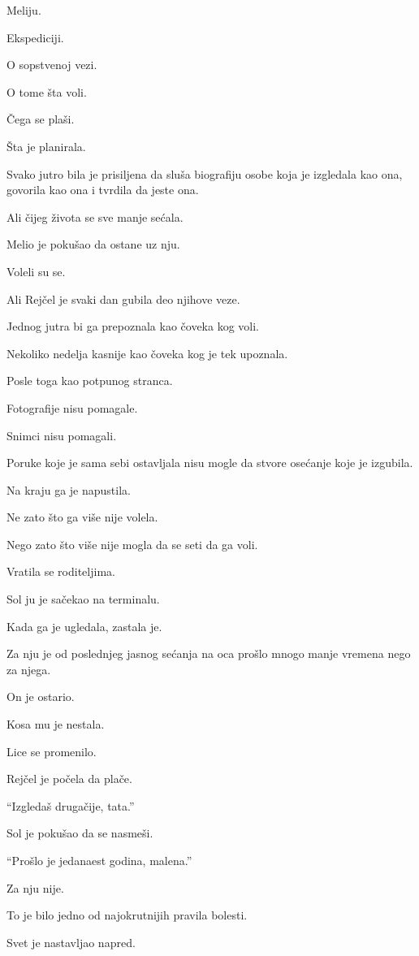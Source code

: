 Meliju.

Ekspediciji.

O sopstvenoj vezi.

O tome šta voli.

Čega se plaši.

Šta je planirala.

Svako jutro bila je prisiljena da sluša biografiju osobe koja je izgledala kao ona, govorila kao ona i tvrdila da jeste ona.

Ali čijeg života se sve manje sećala.

Melio je pokušao da ostane uz nju.

Voleli su se.

Ali Rejčel je svaki dan gubila deo njihove veze.

Jednog jutra bi ga prepoznala kao čoveka kog voli.

Nekoliko nedelja kasnije kao čoveka kog je tek upoznala.

Posle toga kao potpunog stranca.

Fotografije nisu pomagale.

Snimci nisu pomagali.

Poruke koje je sama sebi ostavljala nisu mogle da stvore osećanje koje je izgubila.

Na kraju ga je napustila.

Ne zato što ga više nije volela.

Nego zato što više nije mogla da se seti da ga voli.

\bigskip

Vratila se roditeljima.

Sol ju je sačekao na terminalu.

Kada ga je ugledala, zastala je.

Za nju je od poslednjeg jasnog sećanja na oca prošlo mnogo manje vremena nego za njega.

On je ostario.

Kosa mu je nestala.

Lice se promenilo.

Rejčel je počela da plače.

``Izgledaš drugačije, tata.''

Sol je pokušao da se nasmeši.

``Prošlo je jedanaest godina, malena.''

Za nju nije.

To je bilo jedno od najokrutnijih pravila bolesti.

Svet je nastavljao napred.

